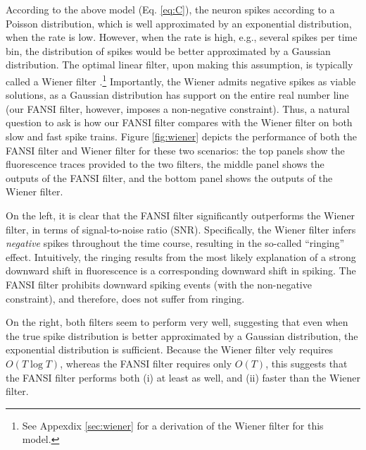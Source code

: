 According to the above model (Eq. \eqref{eq:C}), the neuron spikes according to a Poisson distribution, which is well approximated by an exponential distribution, when the rate is low.  However, when the rate is high, e.g., several spikes per time bin, the distribution of spikes would be better approximated by a Gaussian distribution.  The optimal linear filter, upon making this assumption, is typically called a Wiener filter \cite{Wiener49}.\footnote{See Appexdix \ref{sec:wiener} for a derivation of the Wiener filter for this model.}  Importantly, the Wiener admits negative spikes as viable solutions, as a Gaussian distribution has support on the entire real number line (our FANSI filter, however, imposes a non-negative constraint).  Thus, a natural question to ask is how our FANSI filter compares with the Wiener filter on both slow and fast spike trains.  Figure \ref{fig:wiener} depicts the performance of both the FANSI filter and Wiener filter for these two scenarios: the top panels show the fluorescence traces provided to the two filters, the middle panel shows the outputs of the FANSI filter, and the bottom panel shows the outputs of the Wiener filter.

On the left, it is clear that the FANSI filter significantly outperforms the Wiener filter, in terms of signal-to-noise ratio (SNR).  Specifically, the Wiener filter infers \emph{negative} spikes throughout the time course, resulting in the so-called ``ringing'' effect.  Intuitively, the ringing results from the most likely explanation of a strong downward shift in fluorescence is a corresponding downward shift in spiking.  The FANSI filter prohibits downward spiking events (with the non-negative constraint), and therefore, does not suffer from ringing.  

On the right, both filters seem to perform very well, suggesting that even when the true spike distribution is better approximated by a Gaussian distribution, the exponential distribution is sufficient.  Because the Wiener filter \nai vely requires $O(T \log T)$, whereas the FANSI filter requires only $O(T)$, this suggests that the FANSI filter performs both (i) at least as well, and (ii) faster than the Wiener filter.  

